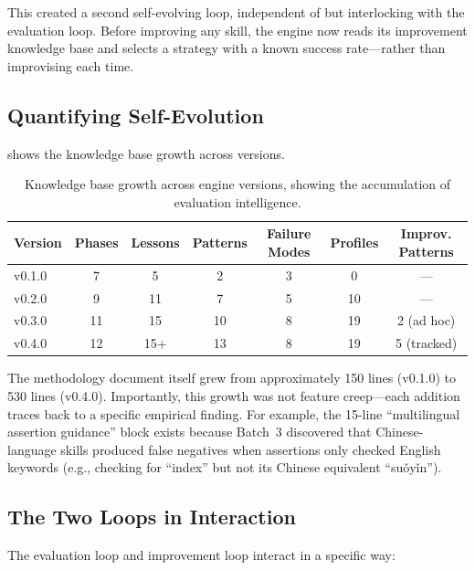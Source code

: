 \documentclass[11pt,a4paper]{article}
\begin{document}
This created a second self-evolving loop, independent of but interlocking with the evaluation loop. Before improving any skill, the engine now reads its improvement knowledge base and selects a strategy with a known success rate---rather than improvising each time.

\subsection{Quantifying Self-Evolution}

 shows the knowledge base growth across versions.

\begin{table}[h]
\centering
\caption{Knowledge base growth across engine versions, showing the accumulation of evaluation intelligence.}
\label{tab:evolution}
\begin{tabular}{lcccccc}
\toprule
\textbf{Version} & \textbf{Phases} & \textbf{Lessons} & \textbf{Patterns} & \textbf{Failure Modes} & \textbf{Profiles} & \textbf{Improv. Patterns} \\
\midrule
v0.1.0 & 7 & 5 & 2 & 3 & 0 & --- \\
v0.2.0 & 9 & 11 & 7 & 5 & 10 & --- \\
v0.3.0 & 11 & 15 & 10 & 8 & 19 & 2 (ad hoc) \\
v0.4.0 & 12 & 15+ & 13 & 8 & 19 & 5 (tracked) \\
\bottomrule
\end{tabular}
\end{table}

The methodology document itself grew from approximately 150 lines (v0.1.0) to 530 lines (v0.4.0). Importantly, this growth was not feature creep---each addition traces back to a specific empirical finding. For example, the 15-line ``multilingual assertion guidance'' block exists because Batch~3 discovered that Chinese-language skills produced false negatives when assertions only checked English keywords (e.g., checking for ``index'' but not its Chinese equivalent ``su\v{o}y\v{i}n'').

\subsection{The Two Loops in Interaction}

The evaluation loop and improvement loop interact in a specific way:
\end{document}
